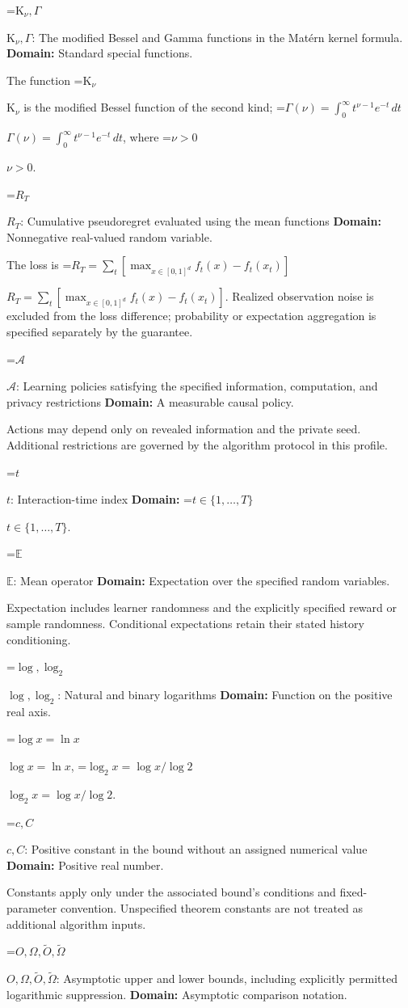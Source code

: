 \documentclass[10pt,a4paper]{article}
\newcommand{\AtlasMath}[1]{\par\begingroup\centering\setbox0=\hbox{$\displaystyle #1$}\ifdim\wd0>1.4\linewidth\typeout{ATLAS WIDE FORMULA: \the\wd0}\fi\ifdim\wd0>\linewidth\resizebox{\linewidth}{!}{\box0}\else\box0\fi\par\endgroup}
\newcommand{\AtlasInlineMath}[1]{\begingroup\setbox0=\hbox{$#1$}\ifdim\wd0>.4\linewidth\endgroup\AtlasMath{#1}\else\endgroup$#1$\fi}
\begin{document}
\AtlasInlineMath{\mathrm K_\nu,\Gamma}: The modified Bessel and Gamma functions in the Matérn kernel formula. \textbf{Domain:} Standard special functions.

The function \AtlasInlineMath{\mathrm K_\nu} is the modified Bessel function of the second kind; \AtlasInlineMath{\Gamma(\nu)=\int_0^\infty t^{\nu-1}e^{-t}\,dt}, where \AtlasInlineMath{\nu>0}.

\AtlasInlineMath{R_T}: Cumulative pseudoregret evaluated using the mean functions \textbf{Domain:} Nonnegative real-valued random variable.

The loss is \AtlasInlineMath{R_T=\sum_t[\max_{x\in[0,1]^d}f_t(x)-f_t(x_t)]}. Realized observation noise is excluded from the loss difference; probability or expectation aggregation is specified separately by the guarantee.

\AtlasInlineMath{\mathcal A}: Learning policies satisfying the specified information, computation, and privacy restrictions \textbf{Domain:} A measurable causal policy.

Actions may depend only on revealed information and the private seed. Additional restrictions are governed by the algorithm protocol in this profile.

\AtlasInlineMath{t}: Interaction-time index \textbf{Domain:} \AtlasInlineMath{t\in\{1,\ldots,T\}}.

\AtlasInlineMath{\mathbb E}: Mean operator \textbf{Domain:} Expectation over the specified random variables.

Expectation includes learner randomness and the explicitly specified reward or sample randomness. Conditional expectations retain their stated history conditioning.

\AtlasInlineMath{\log,\log_2}: Natural and binary logarithms \textbf{Domain:} Function on the positive real axis.

\AtlasInlineMath{\log x=\ln x}, \AtlasInlineMath{\log_2x=\log x/\log2}.

\AtlasInlineMath{c,C}: Positive constant in the bound without an assigned numerical value \textbf{Domain:} Positive real number.

Constants apply only under the associated bound’s conditions and fixed-parameter convention. Unspecified theorem constants are not treated as additional algorithm inputs.

\AtlasInlineMath{O,\Omega,\widetilde O,\widetilde\Omega}: Asymptotic upper and lower bounds, including explicitly permitted logarithmic suppression. \textbf{Domain:} Asymptotic comparison notation.
\end{document}
